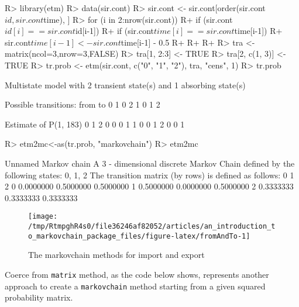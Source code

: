 \documentclass[
  nojss]{jss}
\begin{document}
\begin{CodeChunk}

\begin{CodeInput}
R> library(etm)
R> data(sir.cont)
R> sir.cont <- sir.cont[order(sir.cont$id, sir.cont$time), ]
R> for (i in 2:nrow(sir.cont)) {
R+   if (sir.cont$id[i]==sir.cont$id[i-1]) {
R+     if (sir.cont$time[i]==sir.cont$time[i-1]) {
R+       sir.cont$time[i-1] <- sir.cont$time[i-1] - 0.5
R+     }
R+   }
R+ }
R> tra <- matrix(ncol=3,nrow=3,FALSE)
R> tra[1, 2:3] <- TRUE
R> tra[2, c(1, 3)] <- TRUE
R> tr.prob <- etm(sir.cont, c("0", "1", "2"), tra, "cens", 1)
R> tr.prob
\end{CodeInput}

\begin{CodeOutput}
Multistate model with 2 transient state(s)
 and 1 absorbing state(s)

Possible transitions:
 from to
    0  1
    0  2
    1  0
    1  2

Estimate of P(1, 183)
  0 1 2
0 0 0 1
1 0 0 1
2 0 0 1
\end{CodeOutput}

\begin{CodeInput}
R> etm2mc<-as(tr.prob, "markovchain")
R> etm2mc
\end{CodeInput}

\begin{CodeOutput}
Unnamed Markov chain 
 A  3 - dimensional discrete Markov Chain defined by the following states: 
 0, 1, 2 
 The transition matrix  (by rows)  is defined as follows: 
          0         1         2
0 0.0000000 0.5000000 0.5000000
1 0.5000000 0.0000000 0.5000000
2 0.3333333 0.3333333 0.3333333
\end{CodeOutput}
\end{CodeChunk}

\begin{CodeChunk}
\begin{figure}

{\centering \texttt{[image: /tmp/RtmpghR4s0/file36246af82052/articles/an\_introduction\_to\_markovchain\_package\_files/figure-latex/fromAndTo-1]} 

}

\caption[The markovchain methods for import and export]{The markovchain methods for import and export}\label{fig:fromAndTo}
\end{figure}
\end{CodeChunk}

Coerce from \texttt{matrix} method, as the code below shows, represents another approach to create a \texttt{markovchain} method starting from a given squared probability matrix.
\end{document}
